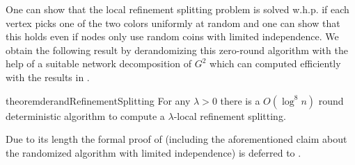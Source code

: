 One can show that the local refinement splitting problem is solved w.h.p. if each vertex picks one of the two colors uniformly at random and one can show that this holds even if nodes only use random coins with limited independence. We obtain the following result by derandomizing this zero-round algorithm with the help of a suitable network decomposition of $G^2$ which can computed efficiently with the results in \cite{RG19}.  
\begin{restatable}{theorem}{derandRefinementSplitting}
\label{lem:derandSplitting}
For any $\lambda>0$ there is a $O(\log^8 n)$ round deterministic {\congest} algorithm to compute a $\lambda$-local refinement splitting.
\end{restatable}
Due to its length the formal proof of  (including the aforementioned claim about the randomized algorithm with limited independence) is deferred to  . 

